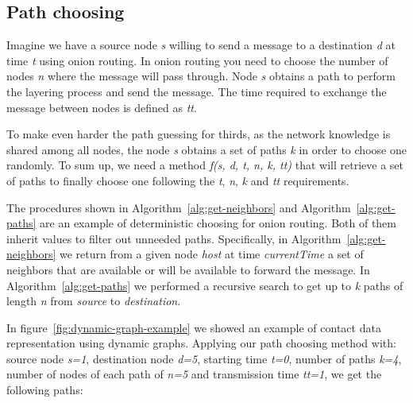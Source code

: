 \subsection{Path choosing}


Imagine we have a source node \textit{s} willing to send a message to a destination \textit{d} at time \textit{t} using onion routing. In onion routing you need to choose the number of nodes  \textit{n} where the message will pass through. Node \textit{s} obtains a path to perform the layering process and send the message. The time required to exchange the message between nodes is defined as \textit{tt}. 

To make even harder the path guessing for thirds, as the network knowledge is shared among all nodes, the node \textit{s} obtains a set of paths \textit{k} in order to choose one randomly. To sum up, we need a method \textit{f(s, d, t, n, k, tt)} that will retrieve a set of paths to finally choose one following the \textit{t}, \textit{n}, \textit{k} and \textit{tt} requirements. 

The procedures shown in Algorithm~\ref{alg:get-neighbors} and Algorithm~\ref{alg:get-paths} are an example of deterministic choosing for onion routing. Both of them inherit values to filter out unneeded paths. Specifically, in Algorithm~\ref{alg:get-neighbors} we return from a given node \textit{host} at time \textit{currentTime} a set of neighbors  that are available or will be available to forward the message. In Algorithm~\ref{alg:get-paths} we performed a recursive search to get up to \textit{k} paths of length \textit{n} from \textit{source} to \textit{destination}.

In figure~\ref{fig:dynamic-graph-example} we showed an example of contact data representation using dynamic graphs. Applying our path choosing method with: source node \textit{s=1}, destination node \textit{d=5}, starting time \textit{t=0}, number of paths \textit{k=4}, number of nodes of each path of \textit{n=5} and transmission time  \textit{tt=1}, we get the following paths: \\


